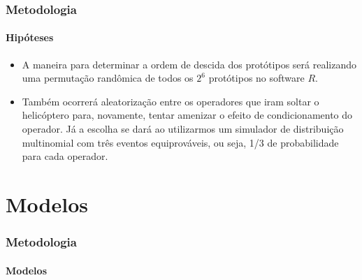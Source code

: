 \documentclass{beamer}
\begin{document}
      \begin{frame}
         \frametitle{Metodologia}
            \framesubtitle{Hipóteses}
               \begin{itemize}
                  \item A maneira para determinar a ordem de descida dos protótipos será realizando uma permutação randômica de todos os $2^6$ protótipos no software $R$.

                  \item Também ocorrerá aleatorização entre os operadores que iram soltar o helicóptero para, novamente, tentar amenizar o efeito de condicionamento do operador. Já a escolha se dará ao utilizarmos um simulador de distribuição multinomial com três eventos equiprováveis, ou seja, 1/3 de probabilidade para cada operador.
               \end{itemize}
      \end{frame}

\section{Modelos}
    \begin{frame}
        \frametitle{Metodologia}
            \framesubtitle{Modelos}
        \begin{figure}
        \end{figure}
    \end{frame}
\end{document}
